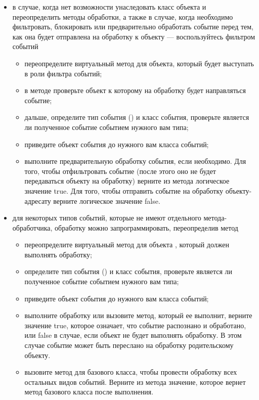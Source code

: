 \begin{itemize}
\item в случае, когда нет возможности унаследовать класс объекта и переопределить методы обработки, а также в случае,
когда необходимо фильтровать, блокировать или предварительно обработать событие перед тем, как она будет отправлена на
обработку к объекту --- воспользуйтесь фильтром событий
 \begin{itemize}
 \item переопределите виртуальный метод  для объекта, который будет выступать в
 роли фильтра событий;
 \item в методе  проверьте объект к которому на обработку будет направляться событие;
 \item дальше, определите тип события () и класс события, проверьте является ли полученное
 событие событием нужного вам типа;
 \item приведите объект события до нужного вам класса событий;
 \item выполните предварительную обработку события, если необходимо. Для того, чтобы отфильтровать событие (после этого
 оно не будет передаваться объекту на обработку) верните из метода логическое значение true. Для того, чтобы отправить
 событие на обработку объекту-адресату верните логическое значение false.
 \end{itemize}

\item для некоторых типов событий, которые не имеют отдельного метода-обработчика, обработку можно запрограммировать,
переопределив метод  
 \begin{itemize}
 \item переопределите виртуальный метод для объекта , который должен выполнять обработку;
 \item определите тип события () и класс события, проверьте является  ли полученное событие
 событием нужного вам типа;
 \item приведите объект события до нужного вам класса событий;
 \item выполните обработку или вызовите метод, который ее выполнит, верните значение true, которое означает, что событие
 распознано и обработано, или false в случае, если объект не будет выполнять обработку. В этом случае событие может быть
 переслано на обработку родительскому объекту.
 \item вызовите метод  для базового класса, чтобы провести обработку всех остальных видов событий.
 Верните из метода значение, которое вернет метод  базового класса после выполнения.
\end{itemize}


\end{itemize}
